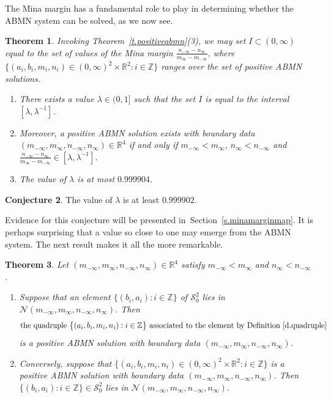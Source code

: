 \documentclass[letterpaper,11pt,oneside,reqno]{amsbook}
\newcommand{\R}{\ensuremath{\mathbb{R}}}
\newcommand{\Z}{\ensuremath{\mathbb{Z}}}
\newtheorem{theorem}{Theorem}[chapter]
\numberwithin{figure}{chapter}
\theoremstyle{definition}
\theoremstyle{definition}
\theoremstyle{definition}
\theoremstyle{definition}
\theoremstyle{definition}
\newtheorem{conjecture}[theorem]{Conjecture}
\newcommand{\mc}{\mathcal}
\newcommand{\tis}{\mc{S}_0}
\newcommand{\abmnmacspace}{\textrm{ABMN} }
\begin{document}
 The Mina margin has a fundamental role to play in determining whether the \abmnmacspace  system can be solved, as we now see. 
 \begin{theorem}\label{t.minamarginvalues}
Invoking Theorem~\ref{t.positiveabmn}(3), we may set $I \subset (0,\infty)$ equal to the set of values of the Mina margin  $\frac{n_{-\infty} - n_\infty}{m_\infty - m_{-\infty}}$, where $\big\{ (a_i,b_i,m_i,n_i) \in (0,\infty)^2 \times \R^2: i \in \Z  \big\}$ 
 ranges over the set of positive \abmnmacspace  solutions. 
 \begin{enumerate}
 \item There exists a value $\lambda \in (0,1]$ such that the set $I$ is equal to the interval $[\lambda,\lambda^{-1}]$.
  \item Moreover, a positive \abmnmacspace  solution exists with boundary data $(m_{-\infty},m_\infty,n_{-\infty},n_\infty) \in \R^4$
  if and only if $m_{-\infty} < m_\infty$, $n_\infty < n_{-\infty}$  and   $\frac{n_{-\infty} - n_\infty}{m_\infty - m_{-\infty}} \in [\lambda,\lambda^{-1}]$.
  \item The value of $\lambda$ is at most $0.999904$. 
  \end{enumerate}
 \end{theorem}
\begin{conjecture}\label{c.lambda} 
The value of $\lambda$ is at least $0.999902$.
 \end{conjecture}
 Evidence for this conjecture will be presented in~Section~\ref{s.minamarginmap}.
 It is perhaps surprising that a value so close to one may emerge from the ABMN system. The next result makes it all the more remarkable.
 \begin{theorem}\label{t.nashabmn}
Let $(m_{-\infty},m_\infty,n_{-\infty},n_\infty) \in \R^4$ satisfy $m_{-\infty}<m_\infty$ and  $n_\infty < n_{-\infty}$. 
 \begin{enumerate}
 \item
 Suppose that an element $\big\{ (b_i,a_i): i \in \Z \big\}$  of $\tis^2$ 
 lies in~$\mc{N}(m_{-\infty},m_\infty,n_{-\infty},n_\infty)$. Then 
 $$
 \textrm{the quadruple $\big\{ (a_i,b_i,m_i,n_i): i \in \Z \big\}$ associated to the element by Definition~\ref{d.quadruple}}
 $$
  is a positive \abmnmacspace  solution with boundary data $(m_{-\infty},m_\infty,n_{-\infty},n_\infty)$.
  \item Conversely, suppose that  $\big\{ (a_i,b_i,m_i,n_i) \in (0,\infty)^2 \times \R^2 : i \in \Z \big\}$ is a positive \abmnmacspace solution
  with boundary  data $(m_{-\infty},m_\infty,n_{-\infty},n_\infty)$. Then  $\big\{ (b_i,a_i): i \in \Z \big\} \in \tis^2$ lies in $\mc{N}(m_{-\infty},m_\infty,n_{-\infty},n_\infty)$.
  \end{enumerate}
 \end{theorem}
\end{document}
